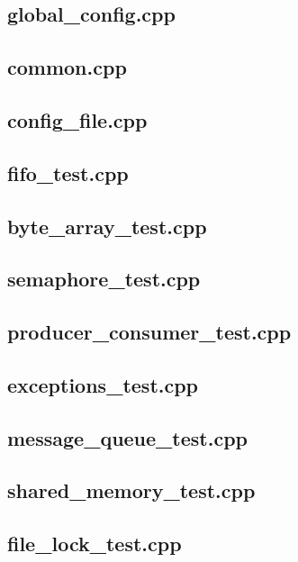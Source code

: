 \subsection*{global_config.cpp}
\scriptsize
\subsection*{common.cpp}
\scriptsize
\subsection*{config_file.cpp}
\scriptsize
\subsection*{fifo_test.cpp}
\scriptsize
\subsection*{byte_array_test.cpp}
\scriptsize
\subsection*{semaphore_test.cpp}
\scriptsize
\subsection*{producer_consumer_test.cpp}
\scriptsize
\subsection*{exceptions_test.cpp}
\scriptsize
\subsection*{message_queue_test.cpp}
\scriptsize
\subsection*{shared_memory_test.cpp}
\scriptsize
\subsection*{file_lock_test.cpp}
\scriptsize
